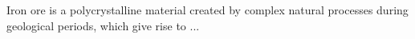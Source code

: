   Iron ore is a polycrystalline material created by complex natural
  processes during geological periods, which give rise to ...
